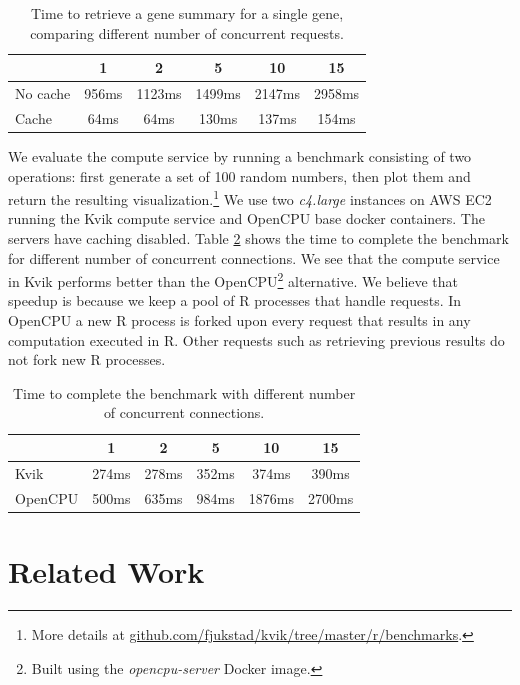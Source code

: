 \begin{table}[h]
    \caption[]{Time to retrieve a gene summary for a single gene, comparing
    different number of concurrent requests.}
    \begin{tabular}{| l | c | c | c | c | c | }
        \hline 
        & 1 & 2 & 5 & 10 & 15 \\ 
      \hline			
      No cache & 956ms & 1123ms & 1499ms & 2147ms & 2958ms\\
      \hline
      Cache & 64ms & 64ms & 130ms & 137ms & 154ms\\
      \hline  
    \end{tabular}
\label{db}
\end{table} 


We evaluate the compute service by running a benchmark consisting of two
operations: first generate a set of 100 random numbers, then plot them and
return the resulting visualization.\footnote{More details at
\url{github.com/fjukstad/kvik/tree/master/r/benchmarks}.} We use two
\emph{c4.large} instances on AWS EC2 running the Kvik compute service and
OpenCPU base docker containers. The servers have caching disabled.  
Table \ref{kvikopencpucomparison} shows the time to complete the benchmark for
different number of concurrent connections. We see that the compute service in
Kvik performs better than the OpenCPU\footnote{Built using the
\textit{opencpu-server} Docker image.} alternative. We believe that speedup is
because we keep a pool of R processes that handle requests. In OpenCPU a new R
process is forked upon every request that results in any computation executed in
R. Other requests such as retrieving previous results do not fork new R
processes. 

\begin{table}[h]
    \caption[]{Time to complete the benchmark with different number of
    concurrent connections.}
    \begin{tabular}{| l | c | c | c | c | c | }
        \hline 
       & 1 & 2 & 5 & 10 & 15 \\ 
      \hline			
      Kvik & 274ms & 278ms & 352ms & 374ms & 390ms\\
      \hline
      OpenCPU & 500ms & 635ms & 984ms & 1876ms & 2700ms\\
      \hline  
    \end{tabular}
\label{kvikopencpucomparison}
\end{table} 


\section{Related Work} 

